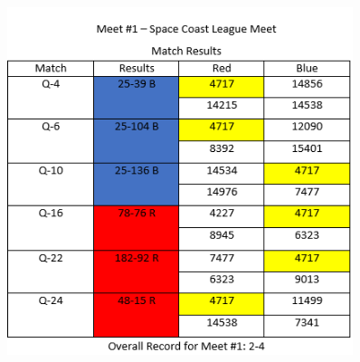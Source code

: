 \begin{figure}[ht]
  \centering
  \includegraphics[width=0.9\textwidth]{Competition/Images/Meet1Score.PNG}
  \caption{}
  \label{fig:comparinggears}
\end{figure} 
